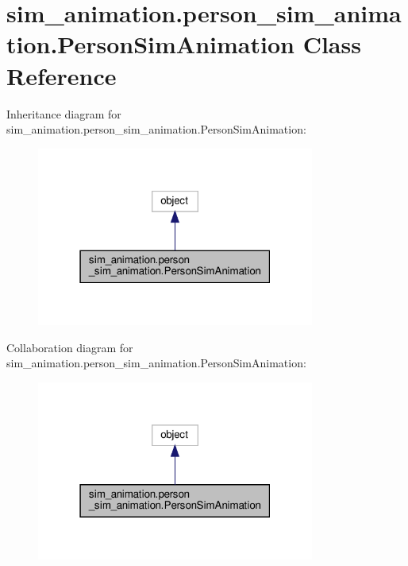 \hypertarget{classsim__animation_1_1person__sim__animation_1_1PersonSimAnimation}{}\section{sim\+\_\+animation.\+person\+\_\+sim\+\_\+animation.\+Person\+Sim\+Animation Class Reference}
\label{classsim__animation_1_1person__sim__animation_1_1PersonSimAnimation}


Inheritance diagram for sim\+\_\+animation.\+person\+\_\+sim\+\_\+animation.\+Person\+Sim\+Animation\+:
\nopagebreak
\begin{figure}[H]
\begin{center}
\leavevmode
\includegraphics[width=259pt]{classsim__animation_1_1person__sim__animation_1_1PersonSimAnimation__inherit__graph}
\end{center}
\end{figure}


Collaboration diagram for sim\+\_\+animation.\+person\+\_\+sim\+\_\+animation.\+Person\+Sim\+Animation\+:
\nopagebreak
\begin{figure}[H]
\begin{center}
\leavevmode
\includegraphics[width=259pt]{classsim__animation_1_1person__sim__animation_1_1PersonSimAnimation__coll__graph}
\end{center}
\end{figure}
